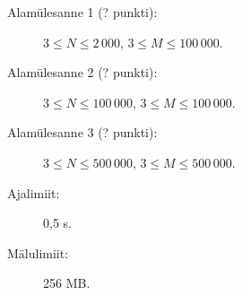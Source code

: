 \documentclass{boi2014-et}
\begin{document}
    \Scoring

    \begin{description}
        \item[Alamülesanne 1 (? punkti):] $3 \le N \le 2\,000$, $3 \le M \le 100\,000$.
        \item[Alamülesanne 2 (? punkti):] $3 \le N \le 100\,000$, $3 \le M \le 100\,000$.
        \item[Alamülesanne 3 (? punkti):] $3 \le N \le 500\,000$, $3 \le M \le 500\,000$.
    \end{description}

    \Constraints

    \begin{description}
        \item[Ajalimiit:] 0,5 s.
        \item[Mälulimiit:] 256 MB.
    \end{description}
\end{document}
